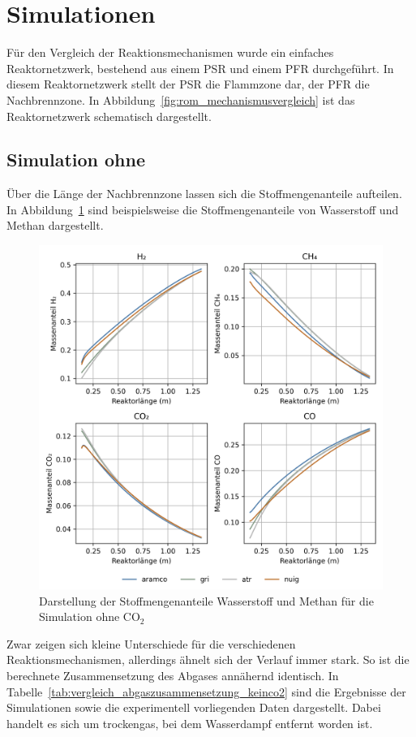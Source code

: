 \documentclass[footmark=none]{tubaf-thesis}
\begin{document}
    \section{Simulationen}
        Für den Vergleich der Reaktionsmechanismen wurde ein einfaches Reaktornetzwerk, bestehend aus einem PSR und einem PFR durchgeführt. In diesem Reaktornetzwerk stellt der PSR die Flammzone dar, der PFR die Nachbrennzone. In Abbildung~\ref{fig:rom_mechanismusvergleich} ist das Reaktornetzwerk schematisch dargestellt.\\
        \subsection{Simulation ohne }
        Über die Länge der Nachbrennzone lassen sich die Stoffmengenanteile aufteilen. In Abbildung~\ref{fig:vergleich_h2_ch4_keinco2} sind beispielsweise die Stoffmengenanteile von Wasserstoff und Methan dargestellt.
        \begin{figure}[H]
            \centering
            \includegraphics[width=0.9\linewidth]{img_py/H2_CH4_CO_CO2_keinCO2.png}
            \caption{Darstellung der Stoffmengenanteile Wasserstoff und Methan für die Simulation ohne CO$_2$}\label{fig:vergleich_h2_ch4_keinco2}
        \end{figure}
        Zwar zeigen sich kleine Unterschiede für die verschiedenen Reaktionsmechanismen, allerdings ähnelt sich der Verlauf immer stark. So ist die berechnete Zusammensetzung des Abgases annähernd identisch. In Tabelle~\ref{tab:vergleich_abgaszusammensetzung_keinco2} sind die Ergebnisse der Simulationen sowie die experimentell vorliegenden Daten dargestellt. Dabei handelt es sich um trockengas, bei dem Wasserdampf entfernt worden ist. 
\end{document}
